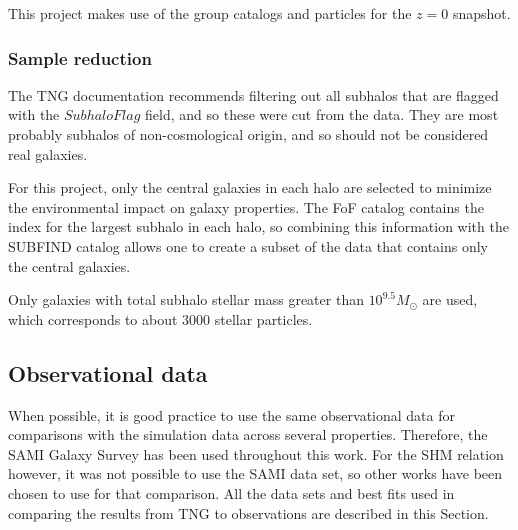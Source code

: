This project makes use of the group catalogs and particles for the $z=0$ snapshot.

\subsubsection{Sample reduction}

The TNG documentation recommends filtering out all subhalos that are flagged with the $SubhaloFlag$ field, and so these were cut from the data. They are most probably subhalos of non-cosmological origin, and so should not be considered real galaxies.

For this project, only the central galaxies in each halo are selected to minimize the environmental impact on galaxy properties. The FoF catalog contains the index for the largest subhalo in each halo, so combining this information with the SUBFIND catalog allows one to create a subset of the data that contains only the central galaxies.

Only galaxies with total subhalo stellar mass greater than $10^{9.5} M_{\odot}$ are used, which corresponds to about 3000 stellar particles.

\subsection{Observational data}
When possible, it is good practice to use the same observational data for comparisons with the simulation data across several properties. Therefore, the SAMI Galaxy Survey \parencite{Bryant2015} has been used throughout this work. For the SHM relation however, it was not possible to use the SAMI data set, so other works have been chosen to use for that comparison. All the data sets and best fits used in comparing the results from TNG to observations are described in this Section.

